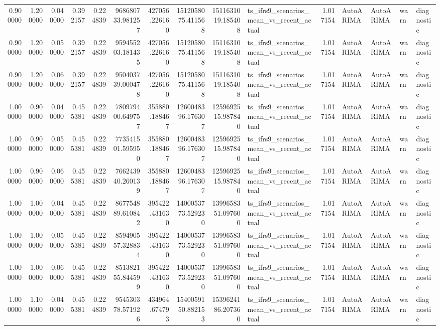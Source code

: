 \begin{tabular}{rrrrrrrrrlrllll}
0.900000 & 1.200000 & 0.040000 & 0.392157 & 0.224839 & 968680733.981257 & 427056.226160 & 1512058075.411568 & 1511631019.185408 & ts_ifrs9_scenarios_mean_vs_recent_actual & 1.017154 & AutoARIMA & AutoARIMA & warn & diagnostic \\
0.900000 & 1.200000 & 0.050000 & 0.392157 & 0.224839 & 959455203.181435 & 427056.226160 & 1512058075.411568 & 1511631019.185408 & ts_ifrs9_scenarios_mean_vs_recent_actual & 1.017154 & AutoARIMA & AutoARIMA & warn & diagnostic \\
0.900000 & 1.200000 & 0.060000 & 0.392157 & 0.224839 & 950403739.000478 & 427056.226160 & 1512058075.411568 & 1511631019.185408 & ts_ifrs9_scenarios_mean_vs_recent_actual & 1.017154 & AutoARIMA & AutoARIMA & warn & diagnostic \\
1.000000 & 0.900000 & 0.040000 & 0.455381 & 0.224839 & 780979400.649757 & 355880.188467 & 1260048396.176307 & 1259692515.987840 & ts_ifrs9_scenarios_mean_vs_recent_actual & 1.017154 & AutoARIMA & AutoARIMA & warn & diagnostic \\
1.000000 & 0.900000 & 0.050000 & 0.455381 & 0.224839 & 773541501.595950 & 355880.188467 & 1260048396.176307 & 1259692515.987840 & ts_ifrs9_scenarios_mean_vs_recent_actual & 1.017154 & AutoARIMA & AutoARIMA & warn & diagnostic \\
1.000000 & 0.900000 & 0.060000 & 0.455381 & 0.224839 & 766243940.260139 & 355880.188467 & 1260048396.176307 & 1259692515.987840 & ts_ifrs9_scenarios_mean_vs_recent_actual & 1.017154 & AutoARIMA & AutoARIMA & warn & diagnostic \\
1.000000 & 1.000000 & 0.040000 & 0.455381 & 0.224839 & 867754889.610842 & 395422.431630 & 1400053773.529230 & 1399658351.097600 & ts_ifrs9_scenarios_mean_vs_recent_actual & 1.017154 & AutoARIMA & AutoARIMA & warn & diagnostic \\
1.000000 & 1.000000 & 0.050000 & 0.455381 & 0.224839 & 859490557.328834 & 395422.431630 & 1400053773.529230 & 1399658351.097600 & ts_ifrs9_scenarios_mean_vs_recent_actual & 1.017154 & AutoARIMA & AutoARIMA & warn & diagnostic \\
1.000000 & 1.000000 & 0.060000 & 0.455381 & 0.224839 & 851382155.844599 & 395422.431630 & 1400053773.529230 & 1399658351.097600 & ts_ifrs9_scenarios_mean_vs_recent_actual & 1.017154 & AutoARIMA & AutoARIMA & warn & diagnostic \\
1.000000 & 1.100000 & 0.040000 & 0.455381 & 0.224839 & 954530378.571926 & 434964.674793 & 1540059150.882153 & 1539624186.207360 & ts_ifrs9_scenarios_mean_vs_recent_actual & 1.017154 & AutoARIMA & AutoARIMA & warn & diagnostic \\

\end{tabular}
